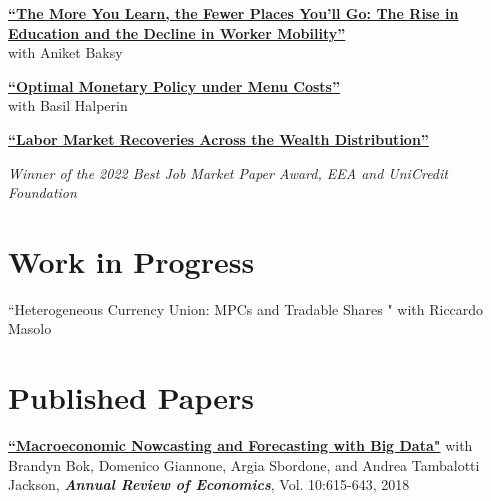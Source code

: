 \documentclass[margin,line]{res}                          %
\newenvironment{list1}{
	\begin{list}{\ding{113}}{%
			\setlength{\itemsep}{0in}
			\setlength{\parsep}{0in} \setlength{\parskip}{0in}
			\setlength{\topsep}{0in} \setlength{\partopsep}{0in}
			\setlength{\leftmargin}{0.17in}}}{\end{list}}
\begin{document}
\begin{resume}
\begin{list1}
		\item[] \href{https://danicaratelli.github.io/research/papers/The_Long_term_Decline_of_the_US_Job_Ladder.pdf}{\textbf{{\color{darkblue}``The More You Learn, the Fewer Places You’ll Go: The Rise in Education and the Decline in Worker Mobility''}}}\\ 
		with Aniket Baksy\smallskip
		
		\vspace{7pt}
				
		\item[] \href{https://danicaratelli.github.io/research/papers/OptimalMP_CaratelliHalperin.pdf}{\textbf{``Optimal Monetary Policy under Menu Costs''}}\\ with Basil Halperin\smallskip
		
		\vspace{7pt}
		
		\item[] \href{https://danicaratelli.github.io/research/papers/JMP_Caratelli.pdf}{\textbf{{\color{darkblue}``Labor Market Recoveries Across the Wealth Distribution''}}}
		\item[] \emph{\textit{Winner of the 2022 Best Job Market Paper Award, EEA and UniCredit Foundation}}\smallskip
					
	\end{list1}
	
	\section{\sc Work in Progress}
	\begin{list1}
		\item[] ``Heterogeneous Currency Union: MPCs and Tradable Shares " with Riccardo Masolo \smallskip
	\end{list1}
	
	\section{\sc Published Papers}
	\begin{list1}
		\item[] \href{https://www.annualreviews.org/doi/abs/10.1146/annurev-economics-083120-111540}{\textbf{``Macroeconomic Nowcasting and Forecasting with Big Data"}} with  Brandyn Bok, Domenico Giannone, Argia Sbordone, and Andrea Tambalotti  Jackson, \textit{\textbf{Annual Review of Economics}}, Vol. 10:615-643, 2018 \smallskip
	\end{list1}
	

\end{resume}
\end{document}
